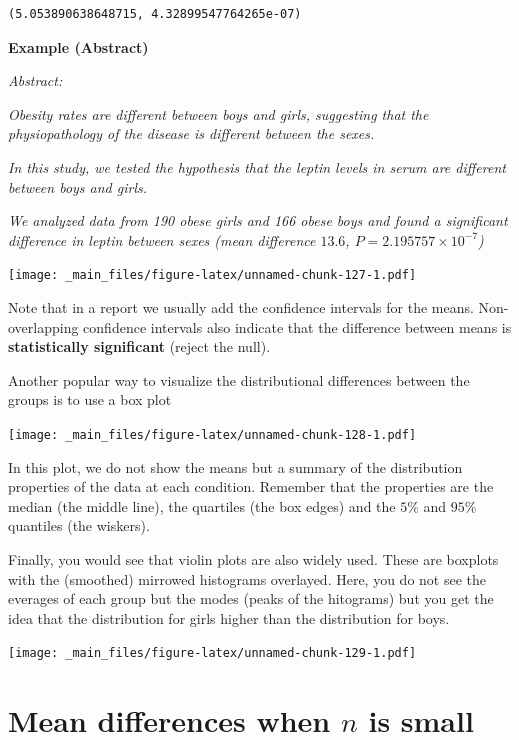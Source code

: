\documentclass[
]{book}
\begin{document}
\begin{verbatim}
(5.053890638648715, 4.32899547764265e-07)
\end{verbatim}

\textbf{Example (Abstract)}

\emph{Abstract:}

\emph{Obesity rates are different between boys and girls, suggesting that the physiopathology of the disease is different between the sexes.}

\emph{In this study, we tested the hypothesis that the leptin levels in serum are different between boys and girls.}

\emph{We analyzed data from 190 obese girls and 166 obese boys and found a significant difference in leptin between sexes (mean difference \(13.6\), \(P=2.195757 \times 10^{-7}\))}

\texttt{[image: \_main\_files/figure-latex/unnamed-chunk-127-1.pdf]}

Note that in a report we usually add the confidence intervals for the means. Non-overlapping confidence intervals also indicate that the difference between means is \textbf{statistically significant} (reject the null).

Another popular way to visualize the distributional differences between the groups is to use a box plot

\texttt{[image: \_main\_files/figure-latex/unnamed-chunk-128-1.pdf]}

In this plot, we do not show the means but a summary of the distribution properties of the data at each condition. Remember that the properties are the median (the middle line), the quartiles (the box edges) and the \(5\%\) and \(95\%\) quantiles (the wiskers).

Finally, you would see that violin plots are also widely used. These are boxplots with the (smoothed) mirrowed histograms overlayed. Here, you do not see the everages of each group but the modes (peaks of the hitograms) but you get the idea that the distribution for girls higher than the distribution for boys.

\texttt{[image: \_main\_files/figure-latex/unnamed-chunk-129-1.pdf]}

\hypertarget{mean-differences-when-n-is-small}{%
\section{\texorpdfstring{Mean differences when \(n\) is small}{Mean differences when n is small}}\label{mean-differences-when-n-is-small}}
\end{document}
